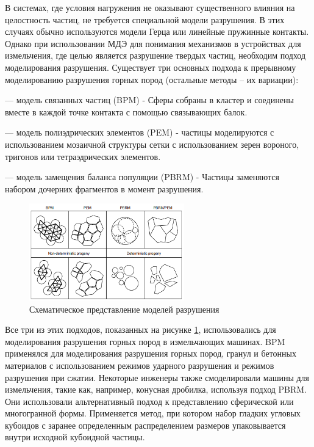 \documentclass[utf8x, 14pt, oneside, a4paper]{article}
\begin{document}
В системах, где условия нагружения не оказывают существенного влияния на целостность частиц, не требуется специальной модели разрушения. 
В этих случаях обычно используются модели Герца или линейные пружинные контакты. 
Однако при использовании МДЭ для понимания механизмов в устройствах для измельчения, где целью является разрушение твердых частиц, необходим подход моделирования разрушения. 
Существует три основных подхода \cite{another_hard} к прерывному моделированию разрушения горных пород (остальные методы -- их вариации):

--- модель связанных частиц (BPM) - Сферы собраны в кластер и соединены вместе в каждой точке контакта с помощью связывающих балок.
 
--- модель полиэдрических элементов (PEM) - частицы моделируются с использованием мозаичной структуры сетки с использованием зерен вороного, тригонов или тетраэдрических элементов.
 
--- модель замещения баланса популяции (PBRM) - Частицы заменяются набором дочерних фрагментов в момент разрушения.
\begin{figure}[H]
	\centering
	\includegraphics[width=0.6\textwidth]{break_model}
	\caption{Схематическое представление моделей разрушения \cite{another_hard}}
	\label{pic:break_model}
\end{figure} 
Все три из этих подходов, показанных на рисунке \ref{pic:break_model}, использовались для моделирования разрушения горных пород в измельчающих машинах. 
BPM применялся для моделирования разрушения горных пород, гранул и бетонных материалов с использованием режимов ударного разрушения и режимов разрушения при сжатии.
Некоторые инженеры \cite{another_hard} также смоделировали машины для измельчения, такие как, например, конусная дробилка, используя подход PBRM. 
Они использовали альтернативный подход к представлению сферической или многогранной формы. 
Применяется метод, при котором набор гладких угловых кубоидов с заранее определенным распределением размеров упаковывается внутри исходной кубоидной частицы.
\end{document}
